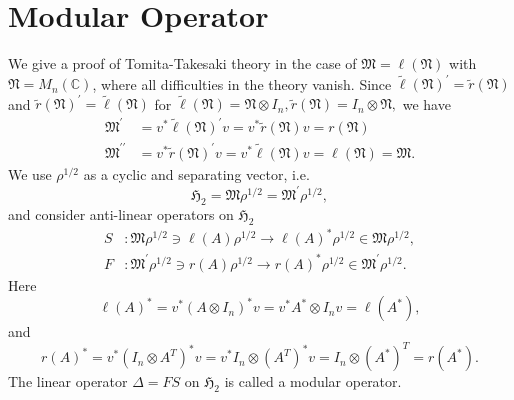 \section{Modular Operator}
We give a proof  of Tomita-Takesaki theory in the case of 
$\mathfrak{M}=\ell(\mathfrak{N})$ with $\mathfrak{N}=M_n(\mathbb{C})$,
where all difficulties in the theory vanish.
Since
$\tilde{\ell}(\mathfrak{N})^\prime=\tilde{r}(\mathfrak{N})$ and $\tilde{r}(\mathfrak{N})^\prime=\tilde{\ell}(\mathfrak{N})$ for 
$
\tilde{\ell}(\mathfrak{N})=\mathfrak{N}\otimes I_n,\tilde{r}(\mathfrak{N})=I_n\otimes \mathfrak{N},
$
we have
\begin{equation}
\begin{split}
\mathfrak{M}^\prime&=v^\ast \tilde{\ell}(\mathfrak{N})^\prime v= v^\ast \tilde{r}(\mathfrak{N})v=r(\mathfrak{N}) \\
\mathfrak{M}^{\prime\prime}&=v^\ast \tilde{r}(\mathfrak{N})^\prime v= v^\ast \tilde{\ell}(\mathfrak{N})v=\ell(\mathfrak{N})=\mathfrak{M}.
\end{split}
\end{equation}
We use $\rho^{1/2}$ as a cyclic and separating vector, i.e. 
$$
\mathfrak{H}_2=\mathfrak{M}\rho^{1/2}=\mathfrak{M}^\prime \rho^{1/2},
$$
and consider  anti-linear operators on $\mathfrak{H}_2$ 
\begin{equation}\label{SF}
	 \begin{split}
		 S&:\mathfrak{M}\rho^{1/2}\ni \ell(A) \rho^{1/2} \to \ell(A)^\ast\rho^{1/2}\in\mathfrak{M}\rho^{1/2},\\
		 F&:\mathfrak{M}^\prime \rho^{1/2}\ni r(A) \rho^{1/2} \to r(A)^\ast\rho^{1/2}\in \mathfrak{M}^\prime \rho^{1/2}.
	 \end{split}
\end{equation}
	Here 
	$$
	\ell(A)^\ast=v^\ast(A\otimes I_n)^\ast v=v^\ast A^\ast \otimes I_n v=\ell(A^\ast),
	$$
	and
	$$
  r(A)^\ast=v^\ast (I_n\otimes A^T)^\ast v=v^\ast I_n\otimes (A^T)^\ast v=I_n\otimes (A^\ast)^T=r(A^\ast).
	$$
	The linear operator $\Delta=FS$ on $\mathfrak{H}_2$ is called a modular operator.

